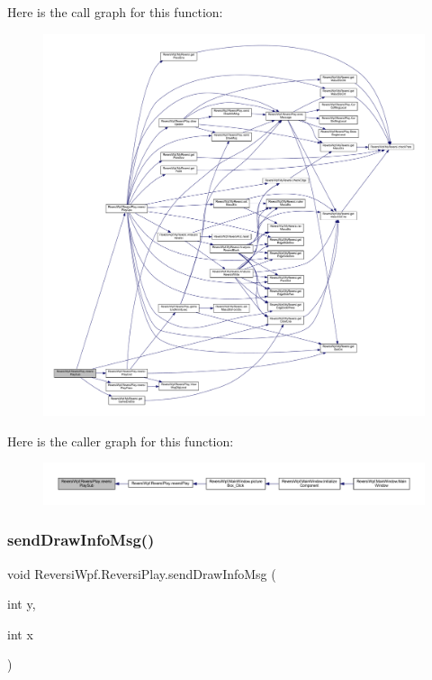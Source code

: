 Here is the call graph for this function\+:
\nopagebreak
\begin{figure}[H]
\begin{center}
\leavevmode
\includegraphics[width=350pt]{class_reversi_wpf_1_1_reversi_play_ae7e23ef808336291a39f0ac37687d1dc_cgraph}
\end{center}
\end{figure}
Here is the caller graph for this function\+:
\nopagebreak
\begin{figure}[H]
\begin{center}
\leavevmode
\includegraphics[width=350pt]{class_reversi_wpf_1_1_reversi_play_ae7e23ef808336291a39f0ac37687d1dc_icgraph}
\end{center}
\end{figure}
\mbox{\label{class_reversi_wpf_1_1_reversi_play_ad05442c4f60d564ea30e57e782efe985}} 
\subsubsection{\texorpdfstring{send\+Draw\+Info\+Msg()}{sendDrawInfoMsg()}}
{\footnotesize\ttfamily void Reversi\+Wpf.\+Reversi\+Play.\+send\+Draw\+Info\+Msg (\begin{DoxyParamCaption}\item[{int}]{y,  }\item[{int}]{x }\end{DoxyParamCaption})}



